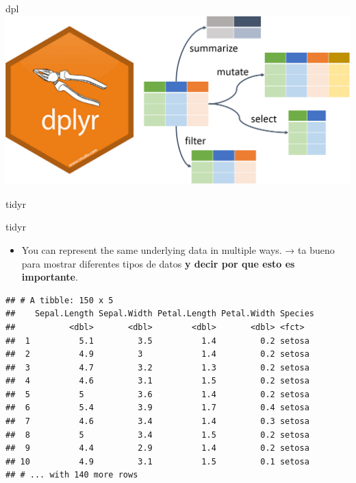 \documentclass[ignorenonframetext,]{beamer}
\providecommand{\tightlist}{%
  \setlength{\itemsep}{0pt}\setlength{\parskip}{0pt}}
\begin{document}
\begin{frame}{dpl}
\includegraphics{dplyr_funciones.png}

\end{frame}

\begin{frame}{tidyr}
\protect\hypertarget{tidyr}{}


\end{frame}

\begin{frame}[fragile]{tidyr}
\protect\hypertarget{tidyr-1}{}

\begin{itemize}
\tightlist
\item
  You can represent the same underlying data in multiple ways. → ta
  bueno para mostrar diferentes tipos de datos \textbf{y decir por que
  esto es importante}.
\end{itemize}

\begin{verbatim}
## # A tibble: 150 x 5
##    Sepal.Length Sepal.Width Petal.Length Petal.Width Species
##           <dbl>       <dbl>        <dbl>       <dbl> <fct>  
##  1          5.1         3.5          1.4         0.2 setosa 
##  2          4.9         3            1.4         0.2 setosa 
##  3          4.7         3.2          1.3         0.2 setosa 
##  4          4.6         3.1          1.5         0.2 setosa 
##  5          5           3.6          1.4         0.2 setosa 
##  6          5.4         3.9          1.7         0.4 setosa 
##  7          4.6         3.4          1.4         0.3 setosa 
##  8          5           3.4          1.5         0.2 setosa 
##  9          4.4         2.9          1.4         0.2 setosa 
## 10          4.9         3.1          1.5         0.1 setosa 
## # ... with 140 more rows
\end{verbatim}

\end{frame}
\end{document}
